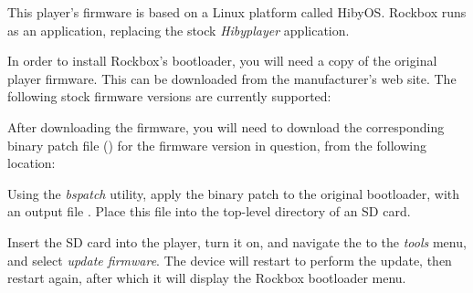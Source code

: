 This player's firmware is based on a Linux platform called HibyOS.  Rockbox
runs as an application, replacing the stock \emph{Hibyplayer} application.

In order to install Rockbox's bootloader, you will need a copy of the
original player firmware.  This can be downloaded from the manufacturer's
web site.  The following stock firmware versions are currently supported:

\begin{itemize}
\end{itemize}

After downloading the firmware, you will need to download the corresponding
binary patch file () for the firmware version in question, from
the following location:

\begin{itemize}
\end{itemize}

Using the \emph{bspatch} utility, apply the binary patch to the original bootloader, with an output file .  Place this file into the top-level directory of an SD card.

Insert the SD card into the player, turn it on, and navigate the to the \emph{tools} menu, and select \emph{update firmware}.  The device will restart to perform the update, then restart again, after which it will display the Rockbox bootloader menu.
